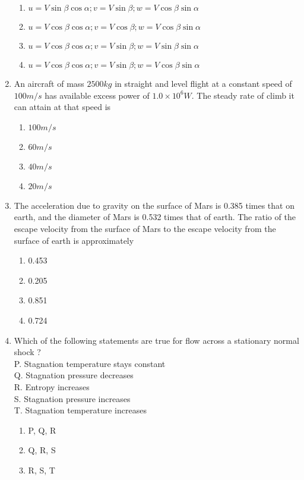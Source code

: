 \documentclass[journal]{IEEEtran}
\begin{document}
\begin{enumerate}
		\begin{enumerate}
			\item $u = V\sin{\beta}\cos{\alpha}; v = V\sin{\beta}; w = V\cos{\beta}\sin{\alpha}$
			\item $u = V\cos{\beta}\cos{\alpha}; v = V\cos{\beta}; w = V\cos{\beta}\sin{\alpha}$
			\item $u = V\cos{\beta}\cos{\alpha}; v = V\sin{\beta}; w = V\sin{\beta}\sin{\alpha}$
			\item $u = V\cos{\beta}\cos{\alpha}; v = V\sin{\beta}; w = V\cos{\beta}\sin{\alpha}$
		\end{enumerate}
	\item
	An aircraft of mass $2500 kg$ in straight and level flight at a constant speed of $100 m/s$ has available excess power of $1.0 \times 10^6 W$. The steady rate of climb it can attain at that speed is 
		\begin{enumerate}
			\item $100 m/s$
			\item $60 m/s$
			\item $40 m/s$
			\item $20 m/s$
		\end{enumerate}
	\item
	The acceleration due to gravity on the surface of Mars is 0.385 times that on earth, and the diameter of Mars is 0.532 times that of earth. The ratio of the escape velocity from the surface of Mars to the escape velocity from the surface of earth is approximately
		\begin{enumerate}
			\item 0.453
			\item 0.205
			\item 0.851
			\item 0.724
		\end{enumerate}
	\item
	Which of the following statements are true for flow across a stationary normal shock ? \\
	P.      Stagnation temperature stays constant \\
	Q.	Stagnation pressure decreases \\
	R.	Entropy increases \\
	S.	Stagnation pressure increases \\
	T.	Stagnation temperature increases
		\begin{enumerate}
			\item P, Q, R
			\item Q, R, S
			\item R, S, T

\end{enumerate}
\end{enumerate}
\end{document}
